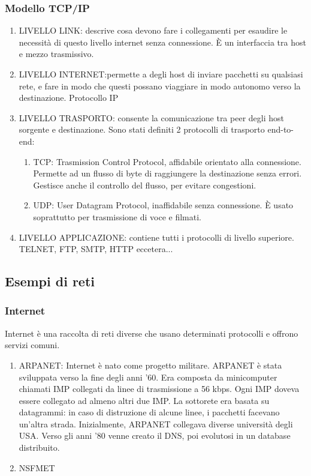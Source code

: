 \documentclass{article}
\begin{document}
			\subsubsection{Modello TCP/IP}
				\begin{enumerate}
					\item LIVELLO LINK: descrive cosa devono fare i collegamenti per esaudire le necessità di questo livello internet senza connessione. È un interfaccia tra host e mezzo trasmissivo.
					\item LIVELLO INTERNET:permette a degli host di inviare pacchetti su qualsiasi rete, e fare in modo che questi possano viaggiare in modo autonomo verso la destinazione. Protocollo IP
					\item LIVELLO TRASPORTO: consente la comunicazione tra peer degli host sorgente e destinazione. Sono stati definiti 2 protocolli di trasporto end-to-end:
					\begin{enumerate}
						\item TCP: Trasmission Control Protocol, affidabile orientato alla connessione. Permette ad un flusso di byte di raggiungere la destinazione senza errori. Gestisce anche il controllo del flusso, per evitare congestioni. 
						\item UDP: User Datagram Protocol, inaffidabile senza connessione. È usato soprattutto per trasmissione di voce e filmati. 
					\end{enumerate}
					\item LIVELLO APPLICAZIONE: contiene tutti i protocolli di livello superiore. TELNET, FTP, SMTP, HTTP eccetera...
				\end{enumerate}
		\subsection{Esempi di reti}
			\subsubsection{Internet}
			Internet è una raccolta di reti diverse che usano determinati protocolli e offrono servizi comuni. 
			\begin{enumerate}
				\item ARPANET: Internet è nato come progetto militare. ARPANET è stata sviluppata verso la fine degli anni '60. Era composta da minicomputer chiamati IMP collegati da linee di trasmissione a 56 kbps. Ogni IMP doveva essere collegato ad almeno altri due IMP. La sottorete era basata su datagrammi: in caso di distruzione di alcune linee, i pacchetti facevano un'altra strada. Inizialmente, ARPANET collegava diverse università degli USA. Verso gli anni '80 venne creato il DNS, poi evolutosi in un database distribuito. 
				\item NSFMET
			\end{enumerate}
		\newpage
\end{document}
